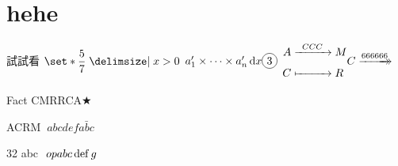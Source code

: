 \tableofcontents
\section{hehe}
試試看
$\set*{\dfrac{5}{7} \mid x > 0}$
$\rng* na\times\d x\circled{3}$
$\maps AM[CCC]CRC\xtwoheadrightarrow{666666}$
\begin{stm}{Fact}
CMRRCA$\bigstar$
\end{stm}
ACRM
$~abc def\bar{abc}$
\begin{enumerate*}[label = \protect\circled{\arabic*}]
    \item 32 abc $~op a{b c} \OP def g$ 
\end{enumerate*}


